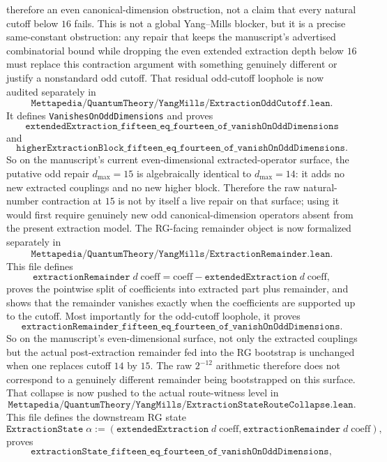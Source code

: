 \documentclass[11pt]{article}
\newcommand{\lean}[1]{\texttt{#1}}
\begin{document}
therefore an even canonical-dimension obstruction, not a claim that every
natural cutoff below \(16\) fails.  This is not a global Yang--Mills blocker,
but it is a precise
same-constant obstruction: any repair that keeps the manuscript's advertised
combinatorial bound while dropping the even extended extraction depth below
\(16\) must replace this contraction argument with something genuinely
different or justify a nonstandard odd cutoff.
That residual odd-cutoff loophole is now audited separately in
\[
  \lean{Mettapedia/QuantumTheory/YangMills/ExtractionOddCutoff.lean}.
\]
It defines \lean{VanishesOnOddDimensions} and proves
\[
  \lean{extendedExtraction\_fifteen\_eq\_fourteen\_of\_vanishOnOddDimensions}
\]
and
\[
  \lean{higherExtractionBlock\_fifteen\_eq\_fourteen\_of\_vanishOnOddDimensions}.
\]
So on the manuscript's current even-dimensional extracted-operator surface, the
putative odd repair \(d_{\max}=15\) is algebraically identical to
\(d_{\max}=14\): it adds no new extracted couplings and no new higher block.
Therefore the raw natural-number contraction at \(15\) is not by itself a live
repair on that surface; using it would first require genuinely new odd
canonical-dimension operators absent from the present extraction model.
The RG-facing remainder object is now formalized separately in
\[
  \lean{Mettapedia/QuantumTheory/YangMills/ExtractionRemainder.lean}.
\]
This file defines
\[
  \lean{extractionRemainder}\;d\;\mathrm{coeff}
    = \mathrm{coeff} - \lean{extendedExtraction}\;d\;\mathrm{coeff},
\]
proves the pointwise split of coefficients into extracted part plus remainder,
and shows that the remainder vanishes exactly when the coefficients are
supported up to the cutoff.  Most importantly for the odd-cutoff loophole, it
proves
\[
  \lean{extractionRemainder\_fifteen\_eq\_fourteen\_of\_vanishOnOddDimensions}.
\]
So on the manuscript's even-dimensional surface, not only the extracted
couplings but the actual post-extraction remainder fed into the RG bootstrap is
unchanged when one replaces cutoff \(14\) by \(15\).  The raw \(2^{-12}\)
arithmetic therefore does not correspond to a genuinely different remainder
being bootstrapped on this surface.
That collapse is now pushed to the actual route-witness level in
\[
  \lean{Mettapedia/QuantumTheory/YangMills/ExtractionStateRouteCollapse.lean}.
\]
This file defines the downstream RG state
\[
  \lean{ExtractionState}\;\alpha
    := (\lean{extendedExtraction}\;d\;\mathrm{coeff},
        \lean{extractionRemainder}\;d\;\mathrm{coeff}),
\]
proves
\[
  \lean{extractionState\_fifteen\_eq\_fourteen\_of\_vanishOnOddDimensions},
\]
\end{document}
